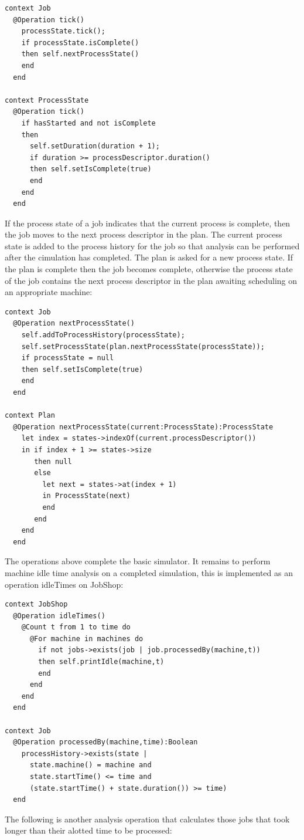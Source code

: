 \begin{lstlisting}
context Job
  @Operation tick()
    processState.tick();
    if processState.isComplete()
    then self.nextProcessState()
    end
  end

context ProcessState
  @Operation tick()
    if hasStarted and not isComplete
    then
      self.setDuration(duration + 1);
      if duration >= processDescriptor.duration()
      then self.setIsComplete(true)
      end
    end
  end
\end{lstlisting}If the process state of a job indicates that the current process is
complete, then the job moves to the next process descriptor in the
plan. The current process state is added to the process history for
the job so that analysis can be performed after the cimulation has
completed. The plan is asked for a new process state. If the plan
is complete then the job becomes complete, otherwise the process state
of the job contains the next process descriptor in the plan awaiting
scheduling on an appropriate machine:

\begin{lstlisting}
context Job
  @Operation nextProcessState()
    self.addToProcessHistory(processState);
    self.setProcessState(plan.nextProcessState(processState));
    if processState = null
    then self.setIsComplete(true)
    end
  end  

context Plan
  @Operation nextProcessState(current:ProcessState):ProcessState
    let index = states->indexOf(current.processDescriptor())
    in if index + 1 >= states->size
       then null
       else 
         let next = states->at(index + 1)
         in ProcessState(next)
         end
       end
    end
  end
\end{lstlisting}The operations above complete the basic simulator. It remains to perform
machine idle time analysis on a completed simulation, this is implemented
as an operation idleTimes on JobShop:

\begin{lstlisting}
context JobShop
  @Operation idleTimes()
    @Count t from 1 to time do
      @For machine in machines do
        if not jobs->exists(job | job.processedBy(machine,t))
        then self.printIdle(machine,t)
        end
      end
    end
  end

context Job
  @Operation processedBy(machine,time):Boolean
    processHistory->exists(state |
      state.machine() = machine and
      state.startTime() <= time and
      (state.startTime() + state.duration()) >= time)
  end
\end{lstlisting}The following is another analysis operation that calculates those
jobs that took longer than their alotted time to be processed:

